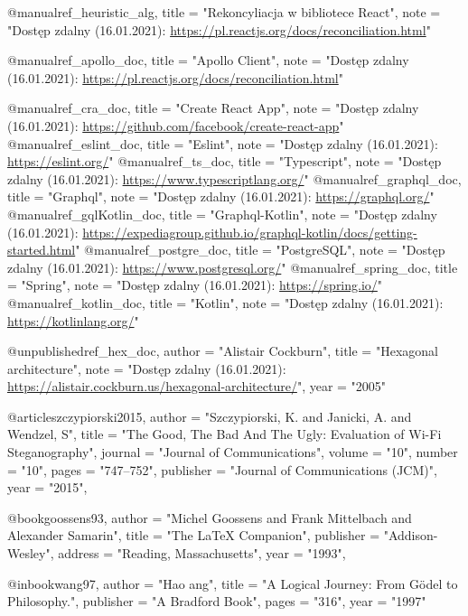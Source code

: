 @manual{ref_heuristic_alg,
    title        = "Rekoncyliacja w bibliotece React",
    note  = "Dostęp zdalny (16.01.2021): \url{https://pl.reactjs.org/docs/reconciliation.html}"
}

@manual{ref_apollo_doc,
    title = "Apollo Client",
    note  = "Dostęp zdalny (16.01.2021): \url{https://pl.reactjs.org/docs/reconciliation.html}"
}

@manual{ref_cra_doc,
    title = "Create React App",
    note  = "Dostęp zdalny (16.01.2021): \url{https://github.com/facebook/create-react-app}"
}
@manual{ref_eslint_doc,
    title = "Eslint",
    note  = "Dostęp zdalny (16.01.2021): \url{https://eslint.org/}"
}
@manual{ref_ts_doc,
    title = "Typescript",
    note  = "Dostęp zdalny (16.01.2021): \url{https://www.typescriptlang.org/}"
}
@manual{ref_graphql_doc,
    title = "Graphql",
    note  = "Dostęp zdalny (16.01.2021): \url{https://graphql.org/}"
}
@manual{ref_gqlKotlin_doc,
    title = "Graphql-Kotlin",
    note  = "Dostęp zdalny (16.01.2021): \url{https://expediagroup.github.io/graphql-kotlin/docs/getting-started.html}"
}
@manual{ref_postgre_doc,
    title = "PostgreSQL",
    note  = "Dostęp zdalny (16.01.2021): \url{https://www.postgresql.org/}"
}
@manual{ref_spring_doc,
    title = "Spring",
    note  = "Dostęp zdalny (16.01.2021): \url{https://spring.io/}"
}
@manual{ref_kotlin_doc,
    title = "Kotlin",
    note  = "Dostęp zdalny (16.01.2021): \url{https://kotlinlang.org/}"
}

@unpublished{ref_hex_doc,
    author = "Alistair Cockburn",
    title  = "Hexagonal architecture",
    note   = "Dostęp zdalny (16.01.2021): \url{https://alistair.cockburn.us/hexagonal-architecture/}",
    year   = "2005"
}

@article{szczypiorski2015,
    author    = "Szczypiorski, K. and Janicki, A. and Wendzel, S",
    title     = "{T}he {G}ood, {T}he {B}ad {A}nd {T}he {U}gly: {E}valuation of {W}i-{F}i {S}teganography",
    journal   = "Journal of Communications",
    volume    = "10",
    number    = "10",
    pages     = "747--752",
    publisher = "Journal of Communications (JCM)",
    year      = "2015",
}

@book{goossens93,
    author    = "Michel Goossens and Frank Mittelbach and Alexander Samarin",
    title     = "The LaTeX Companion",
    publisher = "Addison-Wesley",
    address   = "Reading, Massachusetts",
    year      = "1993",
}

@inbook{wang97,
    author      = "Hao ang",
    title       = "A Logical Journey: From G{\"o}del to Philosophy.",
    publisher   = "A Bradford Book",
    pages       = "316",
    year        = "1997"
}

